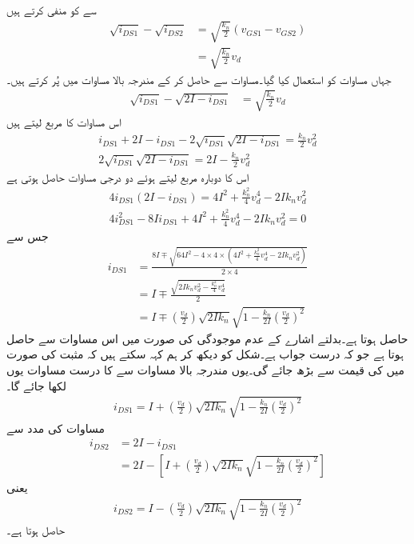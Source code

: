  سے  کو منفی کرتے ہیں
\begin{align*}
\sqrt{i_{DS1}}-\sqrt{i_{DS2}}&=\sqrt{\frac{k_n}{2}} \left(v_{GS1}-v_{GS2} \right)\\
&=\sqrt{\frac{k_n}{2}} v_d
\end{align*}
جہاں مساوات  کو استعمال کیا گیا۔مساوات  سے  حاصل کر کے مندرجہ بالا مساوات میں پُر کرتے ہیں۔
\begin{align*}
\sqrt{i_{DS1}}-\sqrt{2I -i_{DS1}}&=\sqrt{\frac{k_n}{2}} v_d
\end{align*}
اس مساوات کا مربع لیتے ہیں
\begin{align*}
i_{DS1}+2I -i_{DS1} -2\sqrt{i_{DS1}} \sqrt{2I-i_{DS1}} =\frac{k_n}{2} v_d^2\\
2\sqrt{i_{DS1}} \sqrt{2I-i_{DS1}}=2I-\frac{k_n}{2} v_d^2
\end{align*}
اس کا دوبارہ مربع لیتے  ہوئے دو درجی مساوات حاصل ہوتی ہے
\begin{align*}
4 i_{DS1} \left(2I-i_{DS1} \right)=4I^2+\frac{k_n^2}{4} v_d^4-2I k_n v_d^2\\
4 i_{DS1}^2-8 I i_{DS1}+4 I^2+\frac{k_n^2}{4} v_d^4-2 I k_n v_d^2=0
\end{align*}
جس سے
\begin{align*}
i_{DS1}&=\frac{8 I \mp\sqrt{64 I^2 -4 \times 4 \times \left(4 I^2+\frac{k_n^2}{4} v_d^4-2 I k_n v_d^2 \right)}}{2 \times 4}\\
&=I \mp \frac{\sqrt{2 I k_n v_d^2 -\frac{k_n^2}{4} v_d^4}}{2}\\
&=I \mp \left(\frac{v_d}{2} \right)\sqrt{2 I k_n} \sqrt{1-\frac{k_n}{2 I} \left(\frac{v_d}{2} \right)^2}
\end{align*}
حاصل ہوتا ہے۔بدلتے اشارے کے عدم موجودگی  کی صورت میں اس مساوات سے  حاصل ہوتا ہے جو کہ درست جواب ہے۔شکل  کو دیکھ کر ہم کہہ سکتے ہیں کہ  مثبت  کی صورت میں  کی قیمت  سے بڑھ جائے گی۔یوں مندرجہ بالا مساوات سے  کا درست مساوات یوں لکھا جائے گا۔
\begin{align}\label{مساوات_تفرقی_پہلے_ماسفیٹ_کا_برقی_رو}
i_{DS1}=I + \left(\frac{v_d}{2} \right)\sqrt{2 I k_n} \sqrt{1-\frac{k_n}{2 I} \left(\frac{v_d}{2} \right)^2}
\end{align}
مساوات  کی مدد سے 
\begin{align*}
i_{DS2}&=2I-i_{DS1}\\
&=2I-\left[I + \left(\frac{v_d}{2} \right)\sqrt{2 I k_n} \sqrt{1-\frac{k_n}{2 I} \left(\frac{v_d}{2} \right)^2} \right]
\end{align*}
یعنی
\begin{align}\label{مساوات_تفرقی_دوسرے_ماسفیٹ_کا_برقی_رو}
i_{DS2}=I - \left(\frac{v_d}{2} \right)\sqrt{2 I k_n} \sqrt{1-\frac{k_n}{2 I} \left(\frac{v_d}{2} \right)^2}
\end{align}
حاصل ہوتا ہے۔

